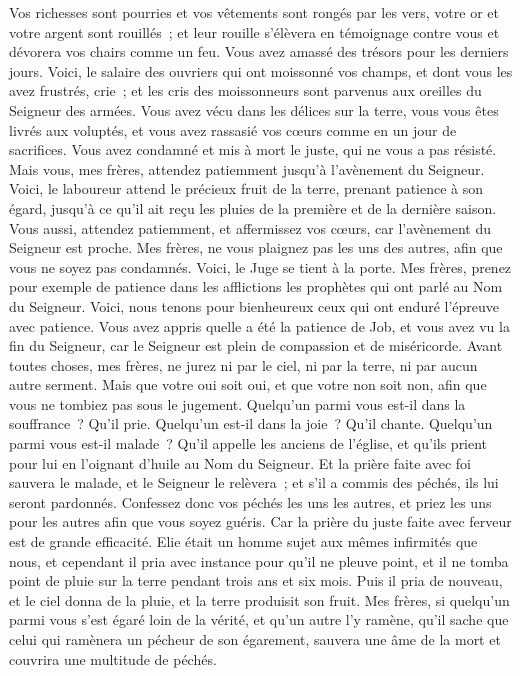 \begin{multicols}{2}
Vos richesses sont pourries et vos vêtements sont rongés par les vers,
votre or et votre argent sont rouillés~; et leur rouille s'élèvera en témoignage contre vous et dévorera vos chairs comme un feu. Vous avez amassé des trésors pour les derniers jours.
Voici, le salaire des ouvriers qui ont moissonné vos champs, et dont vous les avez frustrés, crie~; et les cris des moissonneurs sont parvenus aux oreilles du Seigneur des armées.
Vous avez vécu dans les délices sur la terre, vous vous êtes livrés aux voluptés, et vous avez rassasié vos cœurs comme en un jour de sacrifices.
Vous avez condamné et mis à mort le juste, qui ne vous a pas résisté.
Mais vous, mes frères, attendez patiemment jusqu'à l'avènement du Seigneur. Voici, le laboureur attend le précieux fruit de la terre, prenant patience à son égard, jusqu'à ce qu'il ait reçu les pluies de la première et de la dernière saison.
Vous aussi, attendez patiemment, et affermissez vos cœurs, car l'avènement du Seigneur est proche.
Mes frères, ne vous plaignez pas les uns des autres, afin que vous ne soyez pas condamnés. Voici, le Juge se tient à la porte.
Mes frères, prenez pour exemple de patience dans les afflictions les prophètes qui ont parlé au Nom du Seigneur.
Voici, nous tenons pour bienheureux ceux qui ont enduré l'épreuve avec patience. Vous avez appris quelle a été la patience de Job, et vous avez vu la fin du Seigneur, car le Seigneur est plein de compassion et de miséricorde.
Avant toutes choses, mes frères, ne jurez ni par le ciel, ni par la terre, ni par aucun autre serment. Mais que votre oui soit oui, et que votre non soit non, afin que vous ne tombiez pas sous le jugement.
Quelqu'un parmi vous est-il dans la souffrance~? Qu'il prie. Quelqu'un est-il dans la joie~? Qu'il chante.
Quelqu'un parmi vous est-il malade~? Qu'il appelle les anciens de l'église, et qu'ils prient pour lui en l'oignant d'huile au Nom du Seigneur.
Et la prière faite avec foi sauvera le malade, et le Seigneur le relèvera~; et s'il a commis des péchés, ils lui seront pardonnés.
Confessez donc vos péchés les uns les autres, et priez les uns pour les autres afin que vous soyez guéris. Car la prière du juste faite avec ferveur est de grande efficacité.
Elie était un homme sujet aux mêmes infirmités que nous, et cependant il pria avec instance pour qu'il ne pleuve point, et il ne tomba point de pluie sur la terre pendant trois ans et six mois.
Puis il pria de nouveau, et le ciel donna de la pluie, et la terre produisit son fruit.
Mes frères, si quelqu'un parmi vous s'est égaré loin de la vérité, et qu'un autre l'y ramène,
qu'il sache que celui qui ramènera un pécheur de son égarement, sauvera une âme de la mort et couvrira une multitude de péchés.
\PPE{}
\end{multicols}
